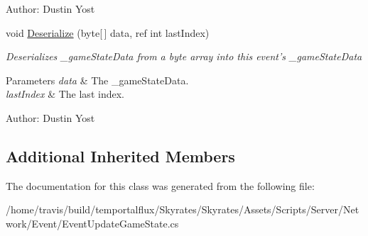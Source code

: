 \begin{DoxyCompactItemize}
\begin{DoxyCompactList}
Author\-: Dustin Yost  \end{DoxyCompactList}\item 
\hypertarget{class_skyrates_1_1_server_1_1_network_1_1_event_1_1_event_update_game_state_a7718453a6ffac0dbd0e63b7dd112d5d0}{void \hyperlink{class_skyrates_1_1_server_1_1_network_1_1_event_1_1_event_update_game_state_a7718453a6ffac0dbd0e63b7dd112d5d0}{Deserialize} (byte\mbox{[}$\,$\mbox{]} data, ref int last\-Index)}\label{class_skyrates_1_1_server_1_1_network_1_1_event_1_1_event_update_game_state_a7718453a6ffac0dbd0e63b7dd112d5d0}

\begin{DoxyCompactList}\small\item\em Deserializes \-\_\-game\-State\-Data from a byte array into this event's \-\_\-game\-State\-Data 


\begin{DoxyParams}{Parameters}
{\em data} & The \-\_\-game\-State\-Data.\\
\hline
{\em last\-Index} & The last index.\\
\hline
\end{DoxyParams}


Author\-: Dustin Yost  \end{DoxyCompactList}\end{DoxyCompactItemize}
\subsection*{Additional Inherited Members}


The documentation for this class was generated from the following file\-:\begin{DoxyCompactItemize}
\item 
/home/travis/build/temportalflux/\-Skyrates/\-Skyrates/\-Assets/\-Scripts/\-Server/\-Network/\-Event/Event\-Update\-Game\-State.\-cs\end{DoxyCompactItemize}

